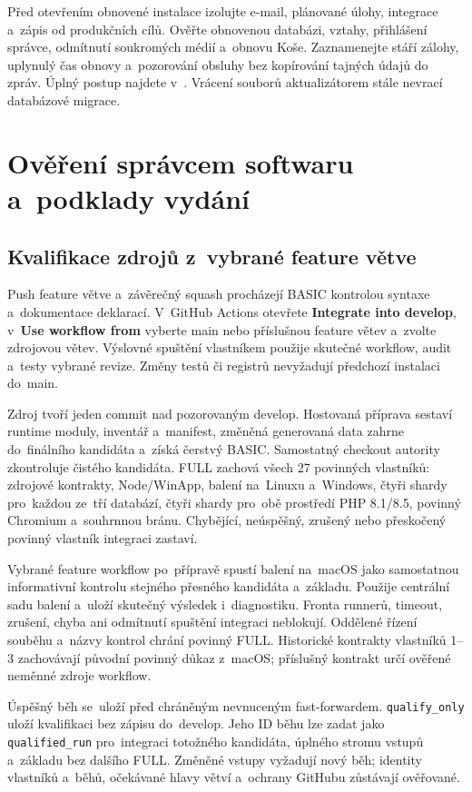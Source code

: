 \documentclass[11pt,a4paper]{article}
\newcommand{\filepath}[1]{\path{#1}}
\newcommand{\ui}[1]{\textbf{#1}}
\newcommand{\codeword}[1]{\nolinkurl{#1}}
\begin{document}
Před otevřením obnovené instalace izolujte e-mail, plánované úlohy, integrace
a~zápis od produkčních cílů. Ověřte obnovenou databázi, vztahy, přihlášení
správce, odmítnutí soukromých médií a~obnovu Koše. Zaznamenejte stáří zálohy,
uplynulý čas obnovy a~pozorování obsluhy bez kopírování tajných údajů do zpráv.
Úplný postup najdete v~\filepath{docs/RECOVERY_OFF_HOST.md}. Vrácení souborů
aktualizátorem stále nevrací databázové migrace.

\section{Ověření správcem softwaru a~podklady vydání}
\label{sec:release-evidence}

\subsection{Kvalifikace zdrojů z~vybrané feature větve}

Push feature větve a~závěrečný squash procházejí BASIC kontrolou syntaxe
a~dokumentace deklarací. V~GitHub Actions otevřete \ui{Integrate into develop},
v~\ui{Use workflow from} vyberte main nebo příslušnou feature větev a~zvolte
zdrojovou větev. Výslovné spuštění vlastníkem použije skutečné workflow,
audit a~testy vybrané revize. Změny testů či registrů nevyžadují předchozí
instalaci do~main.

Zdroj tvoří jeden commit nad pozorovaným develop. Hostovaná příprava sestaví
runtime moduly, inventář a~manifest, změněná generovaná data zahrne
do~finálního kandidáta a~získá čerstvý BASIC. Samostatný checkout autority
zkontroluje čistého kandidáta. FULL zachová všech 27 povinných vlastníků:
zdrojové kontrakty, Node/WinApp, balení na~Linuxu a~Windows, čtyři shardy
pro~každou ze~tří databází, čtyři shardy pro~obě prostředí PHP 8.1/8.5,
povinný Chromium a~souhrnnou bránu. Chybějící, neúspěšný, zrušený nebo
přeskočený povinný vlastník integraci zastaví.

Vybrané feature workflow po~přípravě spustí balení na~macOS jako samostatnou
informativní kontrolu stejného přesného kandidáta a~základu. Použije centrální
sadu balení a~uloží skutečný výsledek i~diagnostiku. Fronta runnerů, timeout,
zrušení, chyba ani odmítnutí spuštění integraci neblokují. Oddělené řízení
souběhu a~názvy kontrol chrání povinný FULL. Historické kontrakty vlastníků
1--3 zachovávají původní povinný důkaz z~macOS; příslušný kontrakt určí
ověřené neměnné zdroje workflow.

Úspěšný běh se~uloží před chráněným nevnuceným fast-forwardem.
\codeword{qualify_only} uloží kvalifikaci bez zápisu do~develop.
Jeho ID běhu lze zadat jako \codeword{qualified_run} pro~integraci
totožného kandidáta, úplného stromu vstupů a~základu bez dalšího FULL.
Změněné vstupy vyžadují nový běh; identity vlastníků a~běhů, očekávané
hlavy větví a~ochrany GitHubu zůstávají ověřované.
\end{document}
